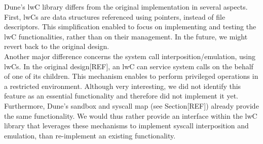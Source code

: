 Dune's lwC library differs from the original implementation in several aspects.
First, lwCs are data structures referenced using pointers, instead of file descriptors.
This simplification enabled to focus on implementing and testing the lwC functionalities, rather than on their management.
In the future, we might revert back to the original design.\\
Another major difference concerns the system call interposition/emulation, using lwCs.
In the original design[REF], an lwC can service system calls on the behalf of one of its children.
This mechanism enables to perform privileged operations in a restricted environment.
Although very interesting, we did not identify this feature as an essential functionality and therefore did not implement it yet.
Furthermore, Dune's sandbox and syscall map (see Section[REF]) already provide the same functionality.
We would thus rather provide an interface within the lwC library that leverages these mechanisms to implement syscall interposition and emulation, than re-implement an existing functionality.
